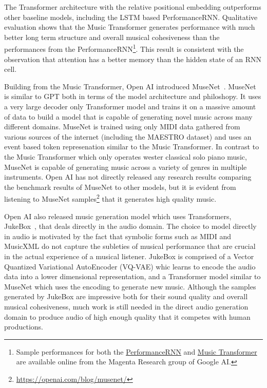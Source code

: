 The Transformer architecture with the relative positional embedding outperforms other baseline models, including the LSTM based PerformanceRNN. Qualitative evaluation shows that the Music Transformer generates performance with much better long term structure and overall musical cohesiveness than the performances from the PerformanceRNN\footnote{Sample performances for both the \href{https://magenta.tensorflow.org/performance-rnn}{PerformanceRNN} and \href{https://magenta.tensorflow.org/music-transformer}{Music Transformer} are  available online from the Magenta Research group of Google AI.}. This result is consistent with the observation that attention has a better memory than the hidden state of an RNN cell. 

Building from the Music Transformer, Open AI introduced MuseNet~\cite{payne_2020}. MuseNet is similar to GPT both in terms of the model architecture and philoshopy. It uses a very large decoder only Transformer model and trains it on a massive amount of data to build a model that is capable of generating novel music across many different domains. MuseNet is trained using only MIDI data gathered from various sources of the internet (including the MAESTRO dataset) and uses an event based token represenation similar to the Music Transformer. In contrast to the Music Transformer which only operates wester classical solo piano music, MuseNet is capable of generating music across a variety of genres in multiple instruments. Open AI has not directly released any research results comparing the benchmark results of MuseNet to other models, but it is evident from listening to MuseNet samples\footnote{\url{https://openai.com/blog/musenet/}} that it generates high quality music. 

Open AI also released music generation model which uses Transformers, JukeBox~\cite{dhariwal2020jukebox}, that deals directly in the audio domain. The choice to model directly in audio is motivated by the fact that symbolic forms such as MIDI and MusicXML do not capture the subleties of musical performance that are crucial in the actual experience of a musical listener. JukeBox is comprised of a Vector Quantized Variational AutoEncoder (VQ-VAE) whic learns to encode the audio data into a lower dimensional representation, and a Transformer model similar to MuseNet which uses the encoding to generate new music. Although the samples generated by JukeBox are impressive both for their sound quality and overall musical cohesiveness, much work is still needed in the direct audio generation domain to produce audio of high enough quality that it competes with human productions. 



